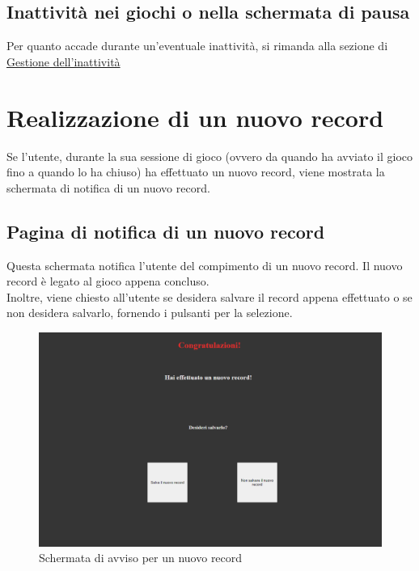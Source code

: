 \subsection{Inattività nei giochi o nella schermata di pausa}
Per quanto accade durante un'eventuale inattività, si rimanda alla sezione di \hyperref[sec:inactivity]{Gestione dell'inattività}
\newpage
\section{Realizzazione di un nuovo record}
Se l'utente, durante la sua sessione di gioco (ovvero da quando ha avviato il gioco fino a quando lo ha chiuso) ha effettuato un nuovo record, viene mostrata la schermata di notifica di un nuovo record.
\subsection{Pagina di notifica di un nuovo record}
Questa schermata notifica l'utente del compimento di un nuovo record. Il nuovo record è legato al gioco appena concluso.\\
Inoltre, viene chiesto all'utente se desidera salvare il record appena effettuato o se non desidera salvarlo, fornendo i pulsanti per la selezione.
\begin{figure}[h]
    \centering
    \includegraphics[width=340pt]{schermataNuovoRecord.png}
    \caption{Schermata di avviso per un nuovo record}
    \label{fig:schermataNuovoRecord}
\end{figure}
